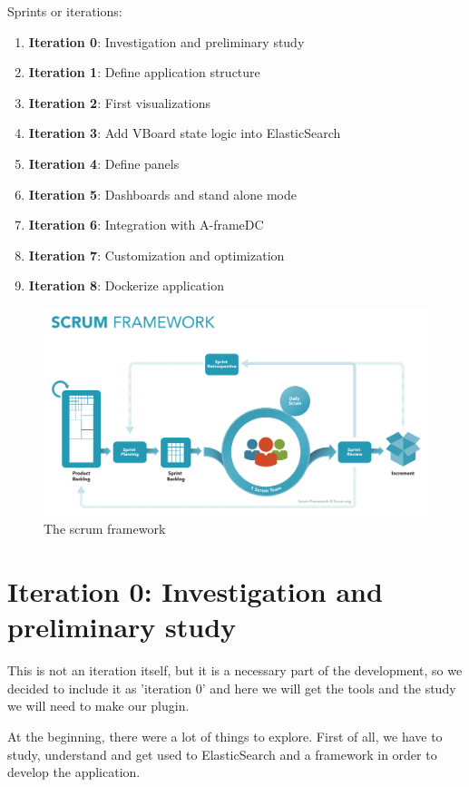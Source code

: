 \documentclass[a4paper, 12pt]{book}
\begin{document}
Sprints or iterations:
\begin{enumerate}
\item \textbf{Iteration 0}: Investigation and preliminary study
\item \textbf{Iteration 1}: Define application structure
\item \textbf{Iteration 2}: First visualizations
\item \textbf{Iteration 3}: Add VBoard state logic into ElasticSearch
\item \textbf{Iteration 4}: Define panels
\item \textbf{Iteration 5}: Dashboards and stand alone mode
\item \textbf{Iteration 6}: Integration with A-frameDC
\item \textbf{Iteration 7}: Customization and optimization
\item \textbf{Iteration 8}: Dockerize application
\end{enumerate}

\begin{figure}[!htb]
  \centering
  \includegraphics[width=15cm, keepaspectratio]{img/development/SCRUM}
  \caption{The scrum framework}
  \label{fig:scrum}
\end{figure}

\section{Iteration 0: Investigation and preliminary study} 
\label{sec:it0}
This is not an iteration itself, but it is a necessary part of the development, so we decided to include it as 'iteration 0' and here we will get the tools and the study we will need to make our plugin. 

At the beginning, there were a lot of things to explore. First of all, we have to study, understand and get used to ElasticSearch and a framework in order to develop the application.
\end{document}
